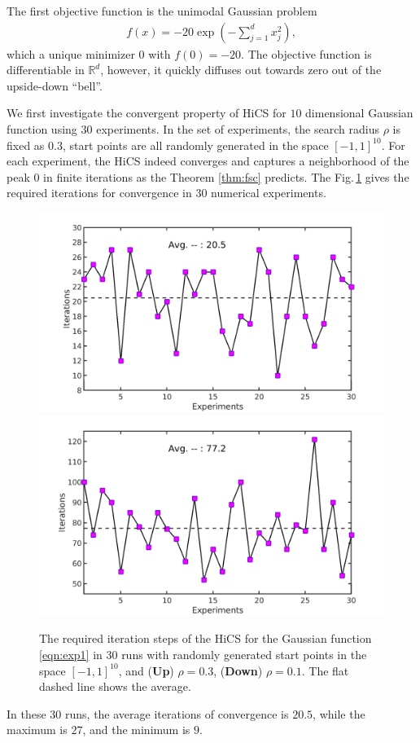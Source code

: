 \documentclass[mathpazo]{csam}
\newcommand{\bbR}{\mathbb{R}}
\theoremstyle{remark}
\begin{document}
The first objective function is the unimodal Gaussian problem
\begin{align}
	f(x) = -20\exp\left(-\sum_{j=1}^d x_j^2 \right),
	\label{eqn:exp1}
\end{align}
which a unique minimizer $0$ with $f(0)=-20$.
The objective function is differentiable in $\bbR^d$, however,
it quickly diffuses out towards zero out of the upside-down ``bell''. 

We first investigate the convergent property of HiCS
for $10$ dimensional Gaussian function using 
$30$ experiments.
In the set of experiments, the search radius $\rho$ is fixed as
$0.3$, start points are all randomly generated in the space $[-1,
1]^{10}$.  For each experiment, the HiCS indeed converges and
captures a neighborhood of the peak
$0$ in finite iterations as the Theorem \ref{thm:fsc} predicts.
The Fig.\,\ref{fig:gauss} gives the required iterations for
convergence in $30$ numerical experiments.
\begin{figure}[t]
	\centering
	  \includegraphics[scale=0.2]{../figures/gauss10Drandr0_3.png}
	  \includegraphics[scale=0.2]{../figures/gauss10Drandr0_1.png}
	  \caption{
	  The required iteration steps of the 
	  HiCS for the Gaussian function
	  \eqref{eqn:exp1} in $30$ runs with randomly generated start points
	  in the space $[-1, 1]^{10}$, and (\textbf{Up}) $\rho=0.3$, (\textbf{Down})
	  $\rho=0.1$. The flat dashed line shows the average.} 
	  \label{fig:gauss}
\end{figure}
In these $30$ runs, the average iterations of convergence is
$20.5$, while the maximum is $27$, and the minimum is $9$.
\end{document}

